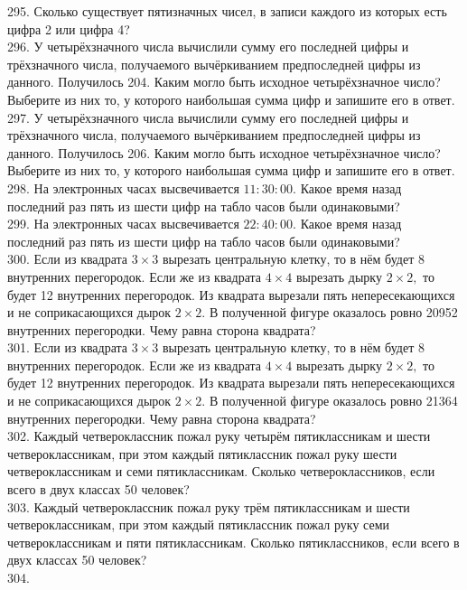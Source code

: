 295. Сколько существует пятизначных чисел, в записи каждого из которых есть цифра 2 или цифра 4?\\
296. У четырёхзначного числа вычислили сумму его последней цифры и трёхзначного числа, получаемого вычёркиванием предпоследней цифры из данного. Получилось 204. Каким могло быть исходное четырёхзначное число? Выберите из них то, у которого наибольшая сумма цифр и запишите его в ответ.\\
297. У четырёхзначного числа вычислили сумму его последней цифры и трёхзначного числа, получаемого вычёркиванием предпоследней цифры из данного. Получилось 206. Каким могло быть исходное четырёхзначное число? Выберите из них то, у которого наибольшая сумма цифр и запишите его в ответ.\\
298. На электронных часах высвечивается $11:30:00.$ Какое время назад последний раз пять из шести цифр на табло часов были одинаковыми?\\
299. На электронных часах высвечивается $22:40:00.$ Какое время назад последний раз пять из шести цифр на табло часов были одинаковыми?\\
300. Если из квадрата $3\times3$ вырезать центральную клетку, то в нём будет 8 внутренних перегородок. Если же из квадрата $4\times4$ вырезать дырку $2\times2,$ то будет 12 внутренних перегородок. Из квадрата вырезали пять непересекающихся и не соприкасающихся дырок $2\times2.$ В полученной фигуре оказалось ровно 20952 внутренних перегородки. Чему равна сторона квадрата?\\
301. Если из квадрата $3\times3$ вырезать центральную клетку, то в нём будет 8 внутренних перегородок. Если же из квадрата $4\times4$ вырезать дырку $2\times2,$ то будет 12 внутренних перегородок. Из квадрата вырезали пять непересекающихся и не соприкасающихся дырок $2\times2.$ В полученной фигуре оказалось ровно 21364 внутренних перегородки. Чему равна сторона квадрата?\\
302. Каждый четвероклассник пожал руку четырём пятиклассникам и шести четвероклассникам, при этом каждый пятиклассник пожал руку шести четвероклассникам и семи пятиклассникам. Сколько четвероклассников, если всего в двух классах 50 человек?\\
303. Каждый четвероклассник пожал руку трём пятиклассникам и шести четвероклассникам, при этом каждый пятиклассник пожал руку семи четвероклассникам и пяти пятиклассникам. Сколько пятиклассников, если всего в двух классах 50 человек?\\
304. \begin{figure}[ht!]
\end{figure}\\
